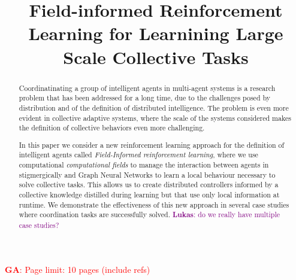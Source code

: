 \documentclass[conference]{IEEEtran}
\begin{document}
%
\title{Field-informed Reinforcement Learning for Learnining Large Scale Collective Tasks} %
%

\author{

\and
{}
\and
{}
}
%
\maketitle              %
%

\newcommand{\meta}[3]{\textcolor{#1}{\textbf{#2}: #3}}
\newcommand{\ga}[1]{\meta{red}{GA}{#1}}
\newcommand{\lukas}[1]{\meta{purple}{Lukas}{#1}}
\newcommand{\mv}[1]{\meta{green}{MV}{#1}}
\ga{Page limit: 10 pages (include refs)}


\begin{abstract}
Coordinatinating a group of intelligent agents in multi-agent systems 
 is a research problem that has been addressed for a long time, 
 due to the challenges posed by distribution and of the definition of distributed intelligence. 
%
The problem is even more evident in collective adaptive systems, 
 where the scale of the systems considered makes the definition of collective behaviors even more challenging. 

In this paper we consider a new reinforcement learning approach 
  for the definition of intelligent agents called \emph{Field-Informed reinforcement learning}, 
  where we use computational \emph{computational fields} to manage the interaction between agents 
  in stigmergically and Graph Neural Networks to learn a local behaviour necessary to solve collective tasks. 
%
This allows us to create distributed controllers informed by a collective knowledge 
 distilled during learning but that use only local information at runtime.
% 
We demonstrate the effectiveness of this new approach in several case studies 
 where coordination tasks are successfully solved. \lukas{do we really have multiple case studies?} 
\end{abstract}
\end{document}
